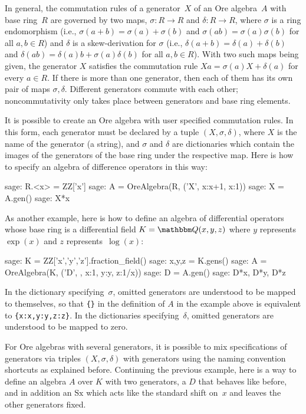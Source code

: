 \documentclass{llncs}
\let\set\mathbbm
\begin{document}
In general, the commutation rules of a generator~$X$ of an Ore algebra~$A$ with
base ring~$R$ are governed by two maps, $\sigma\colon R\to R$ and $\delta\colon R\to R$,
where $\sigma$ is a ring endomorphism (i.e., $\sigma(a+b)=\sigma(a)+\sigma(b)$ and
$\sigma(ab)=\sigma(a)\sigma(b)$ for all $a,b\in R$) and $\delta$ is a skew-derivation
for $\sigma$ (i.e., $\delta(a+b)=\delta(a)+\delta(b)$ and $\delta(ab)=\delta(a)b
+\sigma(a)\delta(b)$ for all $a,b\in R$). With two such maps being given, the
generator $X$ satisfies the commutation rule $Xa=\sigma(a)X+\delta(a)$ for every
$a\in R$. If there is more than one generator, then each of them has its own pair
of maps $\sigma,\delta$. Different generators commute with each other; 
noncommutativity only takes place between generators and base ring elements. 

It is possible to create an Ore algebra with user specified commutation rules.
In this form, each generator must be declared by a tuple $(X,\sigma,\delta)$, 
where $X$ is the name of the generator (a string), and $\sigma$ and $\delta$
are dictionaries which contain the images of the generators of the base
ring under the respective map. Here is how to specify an algebra of difference
operators in this way:

\begin{sageexample}
  sage: R.<x> = ZZ['x']
  sage: A = OreAlgebra(R, ('X', {x:x+1}, {x:1}))
  sage: X = A.gen()
  sage: X*x
\end{sageexample}

As another example, here is how to define an algebra of differential operators 
whose base ring is a differential field $K=\set Q(x,y,z)$ where $y$ represents
$\exp(x)$ and $z$ represents~$\log(x)$:

\begin{sageexample}
  sage: K = ZZ['x','y','z'].fraction_field()
  sage: x,y,z = K.gens()
  sage: A = OreAlgebra(K, ('D', {}, {x:1, y:y, z:1/x}))
  sage: D = A.gen()
  sage: D*x, D*y, D*z
\end{sageexample}

In the dictionary specifying~$\sigma$, omitted generators are understood to be
mapped to themselves, so that \verb|{}| in the definition of $A$ in the example
above is equivalent to \verb|{x:x,y:y,z:z}|. In the dictionaries
specifying~$\delta$, omitted generators are understood to be mapped to zero.

For Ore algebras with several generators, it is possible to mix specifications
of generators via triples $(X,\sigma,\delta)$ with generators using the naming
convention shortcuts as explained before. Continuing the previous example,
here is a way to define an algebra $A$ over $K$ with two generators, a $D$ 
that behaves like before, and in addition an $\mathrm{Sx}$ which acts like the standard
shift on~$x$ and leaves the other generators fixed.
\end{document}
